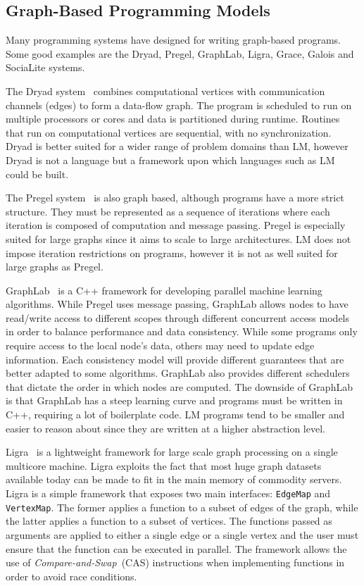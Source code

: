 \subsection{Graph-Based Programming Models}

Many programming systems have designed for writing graph-based programs.  Some
good examples are the Dryad, Pregel, GraphLab, Ligra, Grace, Galois and
SociaLite systems.

The Dryad system~\cite{Isard:2007:DDD:1272996.1273005} combines computational
vertices with communication channels (edges) to form a data-flow graph. The
program is scheduled to run on multiple processors or cores and data is
partitioned during runtime. Routines that run on computational vertices are
sequential, with no synchronization. Dryad is better suited for a wider range of
problem domains than LM, however Dryad is not a language but a framework upon
which languages such as LM could be built.

The Pregel system~\cite{Malewicz:2010:PSL:1807167.1807184} is also graph based,
although programs have a more strict structure. They must be represented as a
sequence of iterations where each iteration is composed of computation and
message passing. Pregel is especially suited for large graphs since it aims to
scale to large architectures. LM does not impose iteration restrictions on
programs, however it is not as well suited for large graphs as Pregel.

GraphLab~\cite{GraphLab2010} is a C++ framework for developing parallel machine
learning algorithms. While Pregel uses message passing, GraphLab allows nodes to
have read/write access to different scopes through different concurrent access
models in order to balance performance and data consistency. While some programs
only require access to the local node's data, others may need to update edge
information. Each consistency model will provide different guarantees that are
better adapted to some algorithms. GraphLab also provides different schedulers
that dictate the order in which nodes are computed. The downside of GraphLab is
that GraphLab has a steep learning curve and programs must be written in C++,
requiring a lot of boilerplate code. LM programs tend to be smaller and easier to
reason about since they are written at a higher abstraction level.

Ligra~\cite{Shun:2013:LLG:2517327.2442530} is a lightweight framework for large
scale graph processing on a single multicore machine. Ligra exploits the fact
that most huge graph datasets available today can be made to fit in the main
memory of commodity servers. Ligra is a simple framework that exposes two main
interfaces: \texttt{EdgeMap} and \texttt{VertexMap}. The former applies a
function to a subset of edges of the graph, while the latter applies a function
to a subset of vertices. The functions passed as arguments are applied to either
a single edge or a single vertex and the user must ensure that the function can
be executed in parallel. The framework allows the use of
\emph{Compare-and-Swap}~(CAS) instructions when implementing functions in order
to avoid race conditions.

